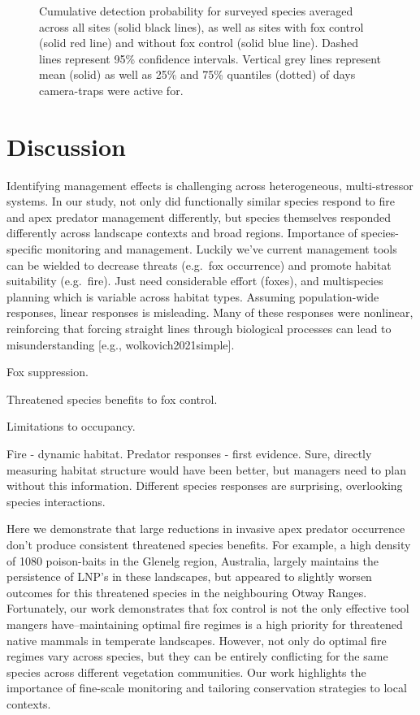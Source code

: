\documentclass[11pt,a4paper,titlepage,twoside,openright]{style/unimelbthesis}
\begin{document}
\begin{mainmatter}
\begin{figure}
{}

\caption{Cumulative detection probability for surveyed species averaged across all sites (solid black lines), as well as sites with fox control (solid red line) and without fox control (solid blue line). Dashed lines represent 95\% confidence intervals. Vertical grey lines represent mean (solid) as well as 25\% and 75\% quantiles (dotted) of days camera-traps were active for.}\label{fig:occ-cumdet}
\end{figure}
\newpage

\hypertarget{discussion-1}{%
\section{Discussion}\label{discussion-1}}

Identifying management effects is challenging across heterogeneous, multi-stressor systems.
In our study, not only did functionally similar species respond to fire and apex predator management differently, but species themselves responded differently across landscape contexts and broad regions.
Importance of species-specific monitoring and management.
Luckily we've current management tools can be wielded to decrease threats (e.g.~fox occurrence) and promote habitat suitability (e.g.~fire). Just need considerable effort (foxes), and multispecies planning which is variable across habitat types.
Assuming population-wide responses, linear responses is misleading.
Many of these responses were nonlinear, reinforcing that forcing straight lines through biological processes can lead to misunderstanding {[}e.g., wolkovich2021simple{]}.

Fox suppression.

Threatened species benefits to fox control.

Limitations to occupancy.

Fire - dynamic habitat.
Predator responses - first evidence.
Sure, directly measuring habitat structure would have been better, but managers need to plan without this information.
Different species responses are surprising, overlooking species interactions.

Here we demonstrate that large reductions in invasive apex predator occurrence don't produce consistent threatened species benefits. For example, a high density of 1080 poison-baits in the Glenelg region, Australia, largely maintains the persistence of LNP's in these landscapes, but appeared to slightly worsen outcomes for this threatened species in the neighbouring Otway Ranges. Fortunately, our work demonstrates that fox control is not the only effective tool mangers have--maintaining optimal fire regimes is a high priority for threatened native mammals in temperate landscapes. However, not only do optimal fire regimes vary across species, but they can be entirely conflicting for the same species across different vegetation communities. Our work highlights the importance of fine-scale monitoring and tailoring conservation strategies to local contexts.


\end{mainmatter}
\end{document}

